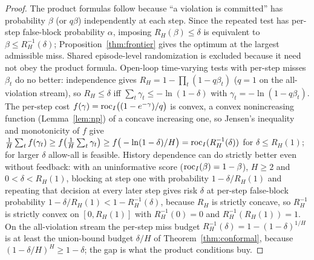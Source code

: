 \begin{proof}
The product formulas follow because ``a violation is committed'' has probability
$\beta$ (or $q\beta$) independently at each step. Since the repeated test has
per-step false-block probability $\alpha$, imposing $R_H(\beta)\le\delta$ is
equivalent to $\beta\le R_H^{-1}(\delta)$; Proposition~\ref{thm:frontier} gives the optimum
at the largest admissible miss. Shared episode-level randomization is excluded
because it need not obey the product formula. Open-loop time-varying tests with per-step
misses $\beta_t$ do no better: independence gives $R_H=1-\prod_t(1-q\beta_t)$ ($q=1$ on the
all-violation stream), so $R_H\le\delta$ iff $\sum_t\gamma_t\le-\ln(1-\delta)$ with
$\gamma_t=-\ln(1-q\beta_t)$. The per-step cost $f(\gamma)=\mathrm{roc}_I\big((1-e^{-\gamma})/q\big)$ is
convex, a convex nonincreasing function (Lemma~\ref{lem:np}) of a concave increasing one, so
Jensen's inequality and monotonicity of $f$ give
$\frac1H\sum_t f(\gamma_t)\ge f\big(\frac1H\sum_t\gamma_t\big)\ge f\big(-\ln(1-\delta)/H\big)
=\mathrm{roc}_I(R_H^{-1}(\delta))$ for $\delta\le R_H(1)$; for larger $\delta$ allow-all is feasible. History dependence can do strictly better even without
feedback: with an uninformative score ($\mathrm{roc}_I(\beta)=1-\beta$), $H\ge2$ and $0<\delta<R_H(1)$,
blocking at step one with probability $1-\delta/R_H(1)$ and repeating that decision at every later
step gives risk $\delta$ at per-step false-block probability $1-\delta/R_H(1)<1-R_H^{-1}(\delta)$,
because $R_H$ is strictly concave, so $R_H^{-1}$ is strictly convex on $[0,R_H(1)]$ with
$R_H^{-1}(0)=0$ and $R_H^{-1}(R_H(1))=1$. On the all-violation stream the per-step miss budget
$R_H^{-1}(\delta)=1-(1-\delta)^{1/H}$ is at least the union-bound budget $\delta/H$ of Theorem~\ref{thm:conformal}, because
$(1-\delta/H)^H\ge1-\delta$; the gap is what the product conditions buy.
\end{proof}

